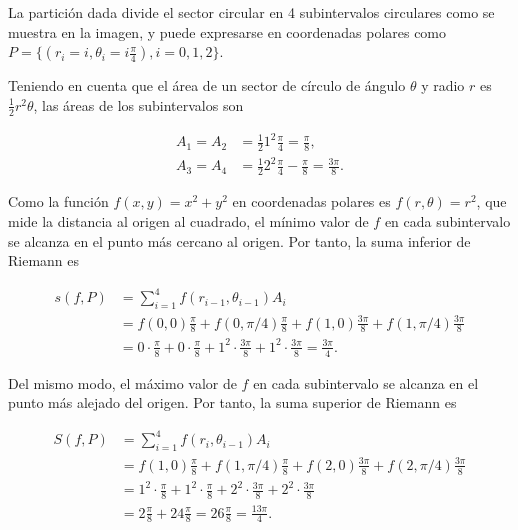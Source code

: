 \documentclass[
  spanish,
  a4paper,
]{scrreport}
\theoremstyle{definition}
\theoremstyle{remark}
\begin{document}
\begin{tcolorbox}[enhanced jigsaw, arc=.35mm, bottomrule=.15mm, bottomtitle=1mm, breakable, colback=white, colbacktitle=quarto-callout-tip-color!10!white, colframe=quarto-callout-tip-color-frame, coltitle=black, left=2mm, leftrule=.75mm, opacityback=0, opacitybacktitle=0.6, rightrule=.15mm, title=\textcolor{quarto-callout-tip-color}{\faLightbulb}\hspace{0.5em}{Solución}, titlerule=0mm, toprule=.15mm, toptitle=1mm]

La partición dada divide el sector circular en 4 subintervalos
circulares como se muestra en la imagen, y puede expresarse en
coordenadas polares como
\(P = \{(r_i = i, \theta_i = i\frac{\pi}{4}), i = 0, 1, 2 \}\).

Teniendo en cuenta que el área de un sector de círculo de ángulo
\(\theta\) y radio \(r\) es \(\frac{1}{2}r^2\theta\), las áreas de los
subintervalos son

\begin{align*}
A_1 = A_2 &= \frac{1}{2} 1^2 \frac{\pi}{4} = \frac{\pi}{8}, \\
A_3 = A_4 &= \frac{1}{2} 2^2 \frac{\pi}{4} - \frac{\pi}{8} = \frac{3\pi}{8}.
\end{align*}

Como la función \(f(x,y) = x^2 + y^2\) en coordenadas polares es
\(f(r,\theta) = r^2\), que mide la distancia al origen al cuadrado, el
mínimo valor de \(f\) en cada subintervalo se alcanza en el punto más
cercano al origen. Por tanto, la suma inferior de Riemann es

\begin{align*}
s(f,P) &= \sum_{i=1}^4 f(r_{i-1}, \theta_{i-1}) A_i \\
&= f(0, 0) \frac{\pi}{8} + f(0, \pi/4) \frac{\pi}{8} + f(1, 0) \frac{3\pi}{8} + f(1, \pi/4) \frac{3\pi}{8} \\
&= 0 \cdot \frac{\pi}{8} + 0 \cdot \frac{\pi}{8} + 1^2 \cdot \frac{3\pi}{8} + 1^2 \cdot \frac{3\pi}{8} 
= \frac{3\pi}{4}.
\end{align*}

Del mismo modo, el máximo valor de \(f\) en cada subintervalo se alcanza
en el punto más alejado del origen. Por tanto, la suma superior de
Riemann es

\begin{align*}
S(f,P) &= \sum_{i=1}^4 f(r_i, \theta_{i-1}) A_i \\
&= f(1, 0) \frac{\pi}{8} + f(1, \pi/4) \frac{\pi}{8} + f(2, 0) \frac{3\pi}{8} + f(2, \pi/4) \frac{3\pi}{8} \\
&= 1^2 \cdot \frac{\pi}{8} + 1^2 \cdot \frac{\pi}{8} + 2^2 \cdot \frac{3\pi}{8} + 2^2 \cdot \frac{3\pi}{8} \\
&= 2\frac{\pi}{8} + 24\frac{\pi}{8} =
26\frac{\pi}{8} 
= \frac{13\pi}{4}.
\end{align*}

\end{tcolorbox}
\end{document}
